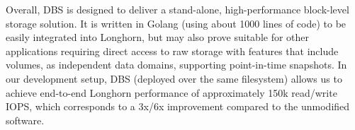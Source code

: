 Overall, DBS is designed to deliver a stand-alone, high-performance block-level storage solution. It is written in Golang (using about 1000 lines of code) to be easily integrated into Longhorn, but may also prove suitable for other applications requiring direct access to raw storage with features that include volumes, as independent data domains, supporting point-in-time snapshots. In our development setup, DBS (deployed over the same filesystem) allows us to achieve end-to-end Longhorn performance of approximately 150k read/write IOPS, which corresponds to a 3x/6x improvement compared to the unmodified software.
